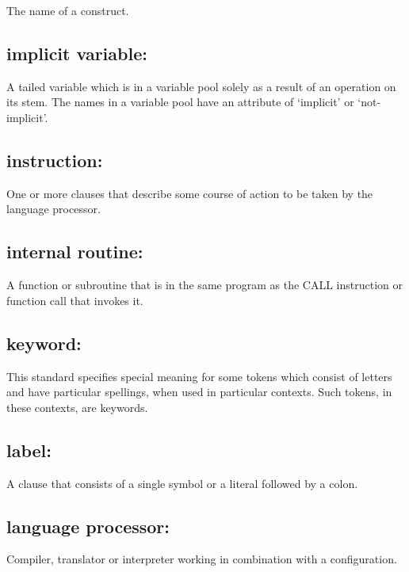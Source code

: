 The name of a construct.

\hypertarget{implicit-variable}{%
\subsection{implicit variable:}\label{implicit-variable}}

A tailed variable which is in a variable pool solely as a result of an
operation on its stem. The names in a variable pool have an attribute of
`implicit' or `not-implicit'.

\hypertarget{instruction}{%
\subsection{instruction:}\label{instruction}}

One or more clauses that describe some course of action to be taken by
the language processor.

\hypertarget{internal-routine}{%
\subsection{internal routine:}\label{internal-routine}}

A function or subroutine that is in the same program as the CALL
instruction or function call that invokes it.

\hypertarget{keyword}{%
\subsection{keyword:}\label{keyword}}

This standard specifies special meaning for some tokens which consist of
letters and have particular spellings, when used in particular contexts.
Such tokens, in these contexts, are keywords.

\hypertarget{label}{%
\subsection{label:}\label{label}}

A clause that consists of a single symbol or a literal followed by a
colon.

\hypertarget{language-processor}{%
\subsection{language processor:}\label{language-processor}}

Compiler, translator or interpreter working in combination with a
configuration.

